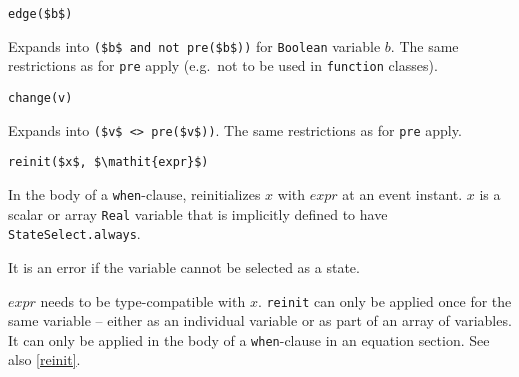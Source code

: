 \begin{operatordefinition}[edge]
\begin{synopsis}\begin{lstlisting}
edge($b$)
\end{lstlisting}\end{synopsis}
\begin{semantics}
Expands into \lstinline!($b$ and not pre($b$))! for \lstinline!Boolean! variable $b$.
The same restrictions as for \lstinline!pre! apply (e.g.\ not to be used in \lstinline!function! classes).
\end{semantics}
\end{operatordefinition}

\begin{operatordefinition}[change]
\begin{synopsis}\begin{lstlisting}
change(v)
\end{lstlisting}\end{synopsis}
\begin{semantics}
Expands into \lstinline!($v$ <> pre($v$))!.
The same restrictions as for \lstinline!pre! apply.
\end{semantics}
\end{operatordefinition}

\begin{operatordefinition}[reinit]
\begin{synopsis}\begin{lstlisting}
reinit($x$, $\mathit{expr}$)
\end{lstlisting}\end{synopsis}
\begin{semantics}
In the body of a \lstinline!when!-clause, reinitializes $x$ with $\mathit{expr}$ at an event instant.
$x$ is a scalar or array \lstinline!Real! variable that is implicitly defined to have \lstinline!StateSelect.always!.
\begin{nonnormative}
It is an error if the variable cannot be selected as a state.
\end{nonnormative}
$\mathit{expr}$ needs to be type-compatible with $x$.
\lstinline!reinit! can only be applied once for the same variable -- either as an individual variable or as part of an array of variables.
It can only be applied in the body of a \lstinline!when!-clause in an equation section.
See also \cref{reinit}.
\end{semantics}
\end{operatordefinition}

